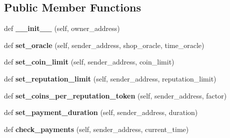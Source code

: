 \subsection*{Public Member Functions}
\begin{DoxyCompactItemize}
\item 
\mbox{\label{class_smart_contract_1_1_smart_contract_ae0684adf8d361d2cb2ab0f3e915956c9}} 
def {\bfseries \+\_\+\+\_\+init\+\_\+\+\_\+} (self, owner\+\_\+address)
\item 
\mbox{\label{class_smart_contract_1_1_smart_contract_a1d9defa78b63a8f0aa1bee8dced6df03}} 
def {\bfseries set\+\_\+oracle} (self, sender\+\_\+address, shop\+\_\+oracle, time\+\_\+oracle)
\item 
\mbox{\label{class_smart_contract_1_1_smart_contract_a654ecc9286669fd414850ae961ab0e3a}} 
def {\bfseries set\+\_\+coin\+\_\+limit} (self, sender\+\_\+address, coin\+\_\+limit)
\item 
\mbox{\label{class_smart_contract_1_1_smart_contract_ad5f5a707acec0876eefca40a7094af10}} 
def {\bfseries set\+\_\+reputation\+\_\+limit} (self, sender\+\_\+address, reputation\+\_\+limit)
\item 
\mbox{\label{class_smart_contract_1_1_smart_contract_ac6c47b1b975447866a59d16d92fe882e}} 
def {\bfseries set\+\_\+coins\+\_\+per\+\_\+reputation\+\_\+token} (self, sender\+\_\+address, factor)
\item 
\mbox{\label{class_smart_contract_1_1_smart_contract_adc1c69e80e6e11fde584bbcd37284f85}} 
def {\bfseries set\+\_\+payment\+\_\+duration} (self, sender\+\_\+address, duration)
\item 
\mbox{\label{class_smart_contract_1_1_smart_contract_aacb8fa6992072fdf90415fda78a66148}} 
def {\bfseries check\+\_\+payments} (self, sender\+\_\+address, current\+\_\+time)
\item 
\mbox{\label{class_smart_contract_1_1_smart_contract_a7630d7053219be5ff175701637523e1a}} 

\end{DoxyCompactItemize}
